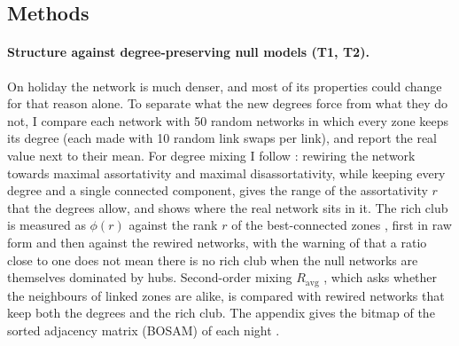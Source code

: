 \subsection{Methods}

\paragraph{Structure against degree-preserving null models (T1, T2).} On holiday the network is much denser, and most of its properties could change for that reason alone. To separate what the new degrees force from what they do not, I compare each network with 50 random networks in which every zone keeps its degree (each made with 10 random link swaps per link), and report the real value next to their mean. For degree mixing I follow \citet{zhou2007structural}: rewiring the network towards maximal assortativity and maximal disassortativity, while keeping every degree and a single connected component, gives the range of the assortativity $r$ that the degrees allow, and shows where the real network sits in it. The rich club is measured as $\phi(r)$ against the rank $r$ of the best-connected zones \citep{zhou2004richclub}, first in raw form and then against the rewired networks, with the warning of \citet{zhou2007structural} that a ratio close to one does not mean there is no rich club when the null networks are themselves dominated by hubs. Second-order mixing $R_{\mathrm{avg}}$ \citep{zhou2017second}, which asks whether the neighbours of linked zones are alike, is compared with rewired networks that keep both the degrees and the rich club. The appendix gives the bitmap of the sorted adjacency matrix (BOSAM) of each night \citep{guo2009fingerprint}.

